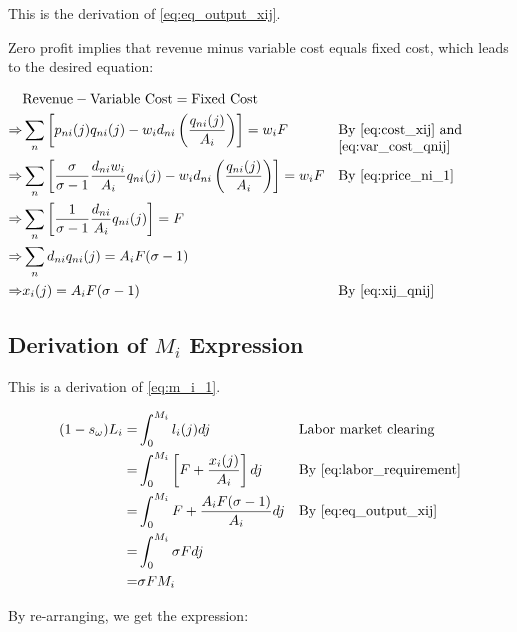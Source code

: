 \documentclass[10pt]{article}
\begin{document}
This is the derivation of \eqref{eq:eq_output_xij}.

Zero profit implies that 
revenue minus variable cost equals fixed cost,
which leads to the desired equation:

\begin{align}
    &\text{Revenue} - \text{Variable Cost} = \text{Fixed Cost} \\
    \Rightarrow & \sum_n \left[p_{ni}(j) q_{ni}(j) - w_i d_{ni} \left(\frac{q_{ni}(j)}{A_i}\right)\right] = w_i F && \parbox[t]{4cm}{\raggedright By \eqref{eq:cost_xij} and \eqref{eq:var_cost_qnij}} \\
    \Rightarrow & \sum_n \left[\frac{\sigma}{\sigma-1} \frac{d_{ni} w_i}{A_i} q_{ni}(j) - w_i d_{ni} \left(\frac{q_{ni}(j)}{A_i}\right)\right] = w_i F && \parbox[t]{4cm}{\raggedright By \eqref{eq:price_ni_1}} \\
    \Rightarrow & \sum_n \left[\frac{1}{\sigma-1} \frac{d_{ni}}{A_i} q_{ni}(j)\right] = F \\ 
    \Rightarrow & \sum_n d_{ni} q_{ni}(j) = A_i F (\sigma-1) \\
    \Rightarrow & x_i(j) = A_i F (\sigma-1) && \parbox[t]{4cm}{\raggedright By \eqref{eq:xij_qnij}}
\end{align}

\subsection{Derivation of $M_i$ Expression}
\label{sec:m_i_1}

This is a derivation of \eqref{eq:m_i_1}.

\begin{align}
    (1-s_\omega) L_i = &\int_{0}^{M_i} l_i(j) dj && \parbox[t]{4cm}{\raggedright Labor market clearing}\\
    = & \int_{0}^{M_i} \left[F + \frac{x_i(j)}{A_i}\right] dj && \text{By \eqref{eq:labor_requirement}} \\
    = &\int_{0}^{M_i} F + \frac{A_i F (\sigma -1)}{A_i} dj && \text{By \eqref{eq:eq_output_xij}} \\
    = &\int_{0}^{M_i} \sigma F dj \\
    = & \sigma F M_i
\end{align}

By re-arranging, we get the expression:
\end{document}
